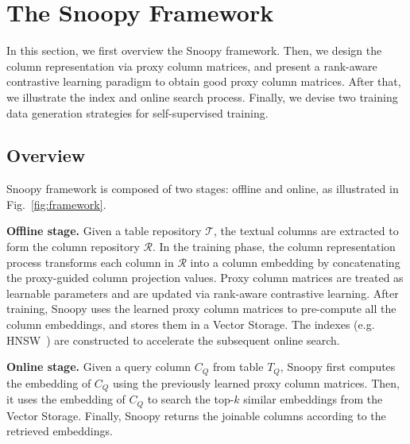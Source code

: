 \section{The \textsf{Snoopy} Framework}
\label{sec:Snoopy}
In this section, we first  
overview the \textsf{Snoopy} framework. Then, we design the column representation via proxy column matrices, and present a rank-aware contrastive learning paradigm to obtain good proxy column matrices. After that, we illustrate the index and online search process. Finally, we devise two training data generation strategies for self-supervised training.





\subsection{Overview}
\label{subsec:overview}

\textsf{Snoopy} framework is composed of two stages: offline and online, as illustrated in Fig.~\ref{fig:framework}.

\noindent\textbf{Offline stage.} Given a table repository $\mathcal{T}$, the textual columns are extracted to form the column repository $\mathcal{R}$. In the  training phase, the column representation process transforms each column in $\mathcal{R}$ into a column embedding by concatenating the proxy-guided column projection values. Proxy column matrices are treated as learnable parameters and are updated via rank-aware contrastive learning.
 After training, \textsf{Snoopy} uses the learned proxy column matrices to pre-compute all the column embeddings, and stores them in a Vector Storage. The indexes (e.g. HNSW~\cite{HNSW}) are constructed to accelerate the subsequent online search.

\noindent\textbf{Online stage.} Given a  query column $C_Q$ from table $T_Q$, \textsf{Snoopy} first computes the embedding of $C_Q$ using the previously learned proxy column  matrices. 
Then, it uses the embedding of $C_Q$ to search the top-$k$ similar embeddings from the Vector Storage. Finally, \textsf{Snoopy} returns the joinable columns according to the retrieved embeddings. 

